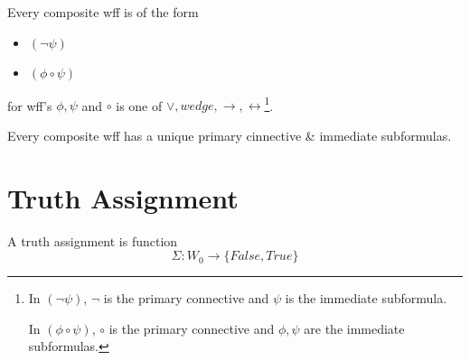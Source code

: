 \documentclass[11pt]{article}
\begin{document}
	Every composite wff is of the form
	\begin{itemize}
		\item $(\neg \psi)$
		\item $(\phi \circ \psi)$
	\end{itemize}
	
	for wff's $\phi, \psi$ and $\circ$ is one of $\vee, wedge, \rightarrow, \leftrightarrow$\footnote{In $(\neg \psi)$, $\neg$ is the primary connective and $\psi$ is the immediate subformula.
	
	In $(\phi \circ \psi)$, $\circ$ is the primary connective and $\phi, \psi$ are the immediate subformulas.}.
	
	\begin{theorem}
		Every composite wff has a unique primary cinnective \& immediate subformulas.
	\end{theorem}
	
	\section{Truth Assignment}
	\begin{definition}
		A truth assignment is function 
		\[\Sigma: W_0 \rightarrow \{False, True\}\]
	\end{definition}
\end{document}
